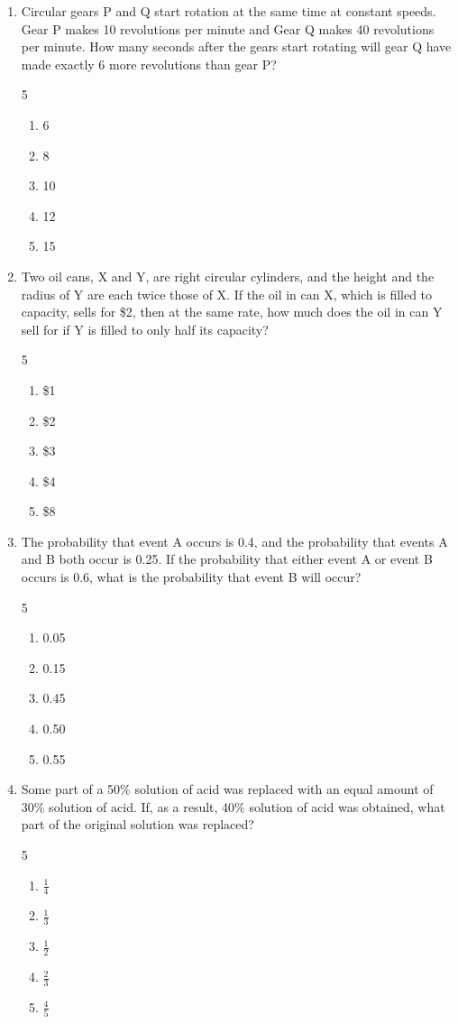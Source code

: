 \documentclass[12pt]{article}
\begin{document}
\begin{enumerate}
\item Circular gears P and Q start rotation at the same time at constant speeds. Gear P makes 10 revolutions per minute and Gear Q makes 40 revolutions per minute. How many seconds after the gears start rotating will gear Q have made exactly 6 more revolutions than gear P?
\begin{multicols}{5}
\begin{enumerate}[label=(\Alph*)]
\item 6
\item 8
\item 10
\item 12
\item 15
\end{enumerate}
\end{multicols}

\item Two oil cans, X and Y, are right circular cylinders, and the height and the radius of Y are each twice those of X. If the oil in can X, which is filled to capacity, sells for \$2, then at the same rate, how much does the oil in can Y sell for if Y is filled to only half its capacity?
\begin{multicols}{5}
\begin{enumerate}[label=(\Alph*)]
\item \$1
\item \$2
\item \$3
\item \$4
\item \$8
\end{enumerate}
\end{multicols}

\item The probability that event A occurs is 0.4, and the probability that events A and B both occur is 0.25. If the probability that either event A or event B occurs is 0.6, what is the probability that event B will occur?
\begin{multicols}{5}
\begin{enumerate}[label=(\Alph*)]
\item 0.05
\item 0.15
\item 0.45
\item 0.50
\item 0.55
\end{enumerate}
\end{multicols}

\item Some part of a 50\% solution of acid was replaced with an equal amount of 30\% solution of acid. If, as a result, 40\% solution of acid was obtained, what part of the original solution was replaced?
\begin{multicols}{5}
\begin{enumerate}[label=(\Alph*)]
\item $\frac{1}{4}$
\item $\frac{1}{3}$
\item $\frac{1}{2}$
\item $\frac{2}{3}$
\item $\frac{4}{5}$
\end{enumerate}
\end{multicols}


\end{enumerate}
\end{document}

